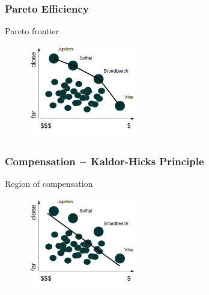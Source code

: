 \documentclass[14pt]{beamer}
\begin{document}
\begin{frame}\frametitle{Pareto Efficiency}

Pareto frontier

\begin{figure}
\centering
\includegraphics[height=1.60in]{hotel2}
\end{figure}

\end{frame}

\begin{frame}\frametitle{Compensation $-$ Kaldor-Hicks Principle}

Region of compensation

\begin{figure}
\centering
\includegraphics[height=1.60in]{hotel3}
\end{figure}

\end{frame}
\end{document}
